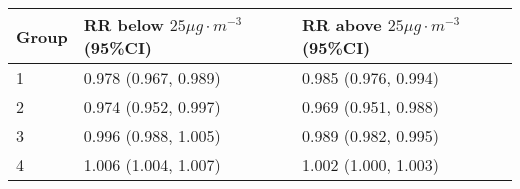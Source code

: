 \begin{tabular}{lll}
  \hline
Group & RR below $25 \mu g \cdot m^{-3}$ (95\%CI) & RR above $25 \mu g \cdot m^{-3}$ (95\%CI) \\ 
  \hline
   1 & 0.978 (0.967, 0.989) & 0.985 (0.976, 0.994) \\ 
     2 & 0.974 (0.952, 0.997) & 0.969 (0.951, 0.988) \\ 
     3 & 0.996 (0.988, 1.005) & 0.989 (0.982, 0.995) \\ 
     4 & 1.006 (1.004, 1.007) & 1.002 (1.000, 1.003) \\ 
   \hline
\end{tabular}

